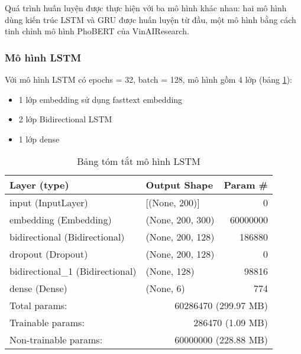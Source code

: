 Quá trình huấn luyện được thực hiện với ba mô hình khác nhau: hai mô hình dùng kiến trúc LSTM và GRU được huấn luyện từ đầu, một mô hình bằng cách tinh chỉnh mô hình PhoBERT của VinAIResearch.

\subsubsection{Mô hình LSTM}
Với mô hình LSTM có epochs = 32, batch = 128, mô hình gồm 4 lớp (bảng \ref{table:lstm-model}):
\begin{itemize}
    \item 1 lớp embedding sử dụng fasttext embedding
    \item 2 lớp Bidirectional LSTM
    \item 1 lớp dense
\end{itemize}

\begin{table}[htb]
    \centering
    \caption{Bảng tóm tắt mô hình LSTM}\label{table:lstm-model}
    \begin{tabular}{l l r}
        \toprule
        \textbf{Layer (type)}            & \textbf{Output Shape}                    & \textbf{Param \#} \\\midrule
        input (InputLayer)               & [(None, 200)]                            & 0                 \\
        embedding (Embedding)            & (None, 200, 300)                         & 60000000          \\
        bidirectional (Bidirectional)    & (None, 200, 128)                         & 186880            \\
        dropout (Dropout)                & (None, 200, 128)                         & 0                 \\
        bidirectional\_1 (Bidirectional) & (None, 128)                              & 98816             \\
        dense (Dense)                    & (None, 6)                                & 774               \\\midrule
        Total params:                    & \multicolumn{2}{r}{60286470 (299.97 MB)}                     \\
        Trainable params:                & \multicolumn{2}{r}{286470 (1.09 MB)}                         \\
        Non-trainable params:            & \multicolumn{2}{r}{60000000 (228.88 MB)}                     \\
        \bottomrule
    \end{tabular}
\end{table}

